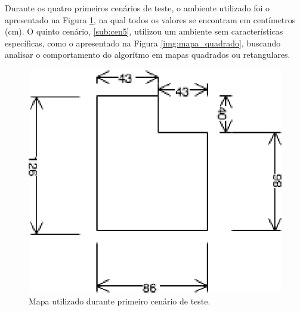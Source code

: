 Durante os quatro primeiros cenários de teste, o ambiente utilizado foi o apresentado na Figura \ref{img:map1}, na qual todos os
valores se encontram em centímetros (cm). O quinto cenário, \ref{sub:cen5}, utilizou um ambiente sem características específicas, como o apresentado
na Figura \ref{img:mapa_quadrado}, buscando analisar o comportamento do algorítmo em mapas quadrados ou retangulares.

\begin{figure}[H]
	\centering
	\includegraphics[scale=1.3]{figuras/map1.eps}
	\caption[Primeiro Cenário de Teste]{Mapa utilizado durante primeiro cenário de teste.}
	\label{img:map1}
\end{figure}


